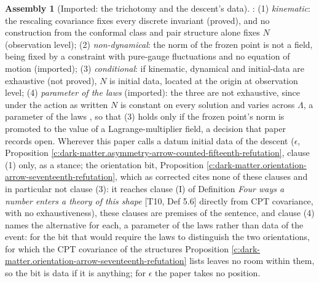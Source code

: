 \documentclass[11pt]{article}
\theoremstyle{definition}
\newtheorem{assembled}[theorem]{Assembly}
\theoremstyle{plain}
\newcommand{\changedmark}[2]{\marginpar{\raggedright\scriptsize\color{#1}#2}}
\begin{document}
\begin{assembled}[Imported: the trichotomy and the descent's data]\label{c:dark-matter.imported-trichotomy-descents-data}
\changedmark{BurntOrange}{changed since the deposit}
\cite[Prop.~7.6]{ButlerT12}: (1) \emph{kinematic}: the rescaling covariance fixes every discrete invariant (proved), and no construction from the conformal class and pair structure alone fixes $N$ (observation level); (2) \emph{non-dynamical}: the norm of the frozen point is not a field, being fixed by a constraint with pure-gauge fluctuations and no equation of motion (imported); (3) \emph{conditional}: if kinematic, dynamical and initial-data are exhaustive (not proved), $N$ is initial data, located at the origin at observation level; (4) \emph{parameter of the laws} (imported): the three are not exhaustive, since under the action as written $N$ is constant on every solution and varies across $\Lambda$, a parameter of the laws \cite[Prop.~5.8]{ButlerT10}, so that (3) holds only if the frozen point's norm is promoted to the value of a Lagrange-multiplier field, a decision that paper records open. Wherever this paper calls a datum initial data of the descent ($\epsilon$, Proposition \ref{c:dark-matter.asymmetry-arrow-counted-fifteenth-refutation}, clause (1) only, as a stance; the orientation bit, Proposition \ref{c:dark-matter.orientation-arrow-seventeenth-refutation}, which as corrected cites none of these clauses and in particular not clause (3): it reaches clause (I) of Definition \emph{Four ways a number enters a theory of this shape} [T10, Def 5.6] directly from CPT covariance, with no exhaustiveness), these clauses are premises of the sentence, and clause (4) names the alternative for each, a parameter of the laws rather than data of the event: for the bit that would require the laws to distinguish the two orientations, for which the CPT covariance of the structures Proposition \ref{c:dark-matter.orientation-arrow-seventeenth-refutation} lists leaves no room within them, so the bit is data if it is anything; for $\epsilon$ the paper takes no position.
\end{assembled}
\end{document}
